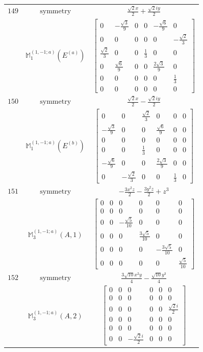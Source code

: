 \documentclass[fleqn,8pt,landscape]{jsarticle}
\begin{document}
\begin{longtable}{ccc}
$ 149 $ & $ \text{symmetry} $ & $ \frac{\sqrt{2} x}{2} + \frac{\sqrt{2} i y}{2} $ \\
$  $ & $ \mathbb{M}_{1}^{(1,-1;a)}(E^{(a)}) $ & $ \begin{bmatrix} 0 & - \frac{\sqrt{3}}{9} & 0 & 0 & - \frac{\sqrt{6}}{9} & 0 \\ 0 & 0 & 0 & 0 & 0 & - \frac{\sqrt{2}}{3} \\ \frac{\sqrt{2}}{3} & 0 & 0 & \frac{1}{3} & 0 & 0 \\ 0 & \frac{\sqrt{6}}{9} & 0 & 0 & \frac{2 \sqrt{3}}{9} & 0 \\ 0 & 0 & 0 & 0 & 0 & \frac{1}{3} \\ 0 & 0 & 0 & 0 & 0 & 0 \end{bmatrix} $ \\ \hline
$ 150 $ & $ \text{symmetry} $ & $ \frac{\sqrt{2} x}{2} - \frac{\sqrt{2} i y}{2} $ \\
$  $ & $ \mathbb{M}_{1}^{(1,-1;a)}(E^{(b)}) $ & $ \begin{bmatrix} 0 & 0 & \frac{\sqrt{2}}{3} & 0 & 0 & 0 \\ - \frac{\sqrt{3}}{9} & 0 & 0 & \frac{\sqrt{6}}{9} & 0 & 0 \\ 0 & 0 & 0 & 0 & 0 & 0 \\ 0 & 0 & \frac{1}{3} & 0 & 0 & 0 \\ - \frac{\sqrt{6}}{9} & 0 & 0 & \frac{2 \sqrt{3}}{9} & 0 & 0 \\ 0 & - \frac{\sqrt{2}}{3} & 0 & 0 & \frac{1}{3} & 0 \end{bmatrix} $ \\ \hline
$ 151 $ & $ \text{symmetry} $ & $ - \frac{3 x^{2} z}{2} - \frac{3 y^{2} z}{2} + z^{3} $ \\
$  $ & $ \mathbb{M}_{3}^{(1,-1;a)}(A,1) $ & $ \begin{bmatrix} 0 & 0 & 0 & 0 & 0 & 0 \\ 0 & 0 & 0 & 0 & 0 & 0 \\ 0 & 0 & - \frac{\sqrt{5}}{10} & 0 & 0 & 0 \\ 0 & 0 & 0 & \frac{3 \sqrt{5}}{10} & 0 & 0 \\ 0 & 0 & 0 & 0 & - \frac{3 \sqrt{5}}{10} & 0 \\ 0 & 0 & 0 & 0 & 0 & \frac{\sqrt{5}}{10} \end{bmatrix} $ \\ \hline
$ 152 $ & $ \text{symmetry} $ & $ \frac{3 \sqrt{10} x^{2} y}{4} - \frac{\sqrt{10} y^{3}}{4} $ \\
$  $ & $ \mathbb{M}_{3}^{(1,-1;a)}(A,2) $ & $ \begin{bmatrix} 0 & 0 & 0 & 0 & 0 & 0 \\ 0 & 0 & 0 & 0 & 0 & 0 \\ 0 & 0 & 0 & 0 & 0 & \frac{\sqrt{2} i}{2} \\ 0 & 0 & 0 & 0 & 0 & 0 \\ 0 & 0 & 0 & 0 & 0 & 0 \\ 0 & 0 & - \frac{\sqrt{2} i}{2} & 0 & 0 & 0 \end{bmatrix} $ \\ \hline

\end{longtable}
\end{document}
